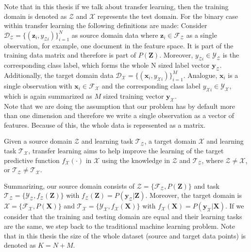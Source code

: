 Note that in this thesis if we talk about transfer learning, then the training domain is denoted as $\mathcal{Z}$ and $\mathcal{X}$ represents the test domain.
For the binary case within transfer learning the following definitions are made:
Consider $\mathcal{D_Z} = \{(\mathbf{z}_i,y_{\mathcal{Z}i})\}_{i=1}^{N}$ as source domain data where $\mathbf{z}_i \in \mathcal{F}_\mathcal{Z}$ as a single observation, for example, one document in the feature space. It is part of the training data matrix and therefore is part of $P(\mathbf{Z})$.
Moreover, $y_{\mathcal{Z}i} \in \mathcal{Y}_\mathcal{Z}$ is the corresponding class label, which forms the whole N sized label vector $\mathbf{y}_\mathcal{Z}$.
Additionally, the target domain data $\mathcal{D_X} = \{(\mathbf{x}_i,y_{\mathcal{X}i})\}_{i=1}^{M}$.
Analogue, $\mathbf{x}_i$ is a single observation with $\mathbf{x}_i \in \mathcal{F}_\mathcal{X}$ and the corresponding class label $y_{\mathcal{X}i} \in \mathcal{Y}_\mathcal{X}$, which is again summarized as $M$ sized training vector $\mathbf{y}_\mathcal{X}$.\cite[p. 2]{Aggarwal.2015}\\
Note that we are doing the assumption that our problem has by default more than one dimension and therefore we write a single observation as a vector of features.
Because of this, the whole data is represented as a matrix.
\begin{mDef}\label{DefTl}
	Given a source domain $\mathcal{Z}$ and learning task $\mathcal{T}_\mathcal{Z}$, a target domain $\mathcal{X}$ and learning task $\mathcal{T}_\mathcal{X}$, transfer learning aims to help improve the learning of the target predictive function $f_\mathcal{X}(\cdot)$ in $\mathcal{X}$ using the knowledge in $\mathcal{Z}$ and $\mathcal{T}_\mathcal{Z}$, where $\mathcal{Z} \neq \mathcal{X}$, or $\mathcal{T}_\mathcal{Z} \neq \mathcal{T}_\mathcal{X}$.\cite[p. 542]{Aggarwal.2015}
\end{mDef}
Summarizing, our source domain consists of $\mathcal{Z}=\{\mathcal{F}_\mathcal{Z},P(\mathbf{Z})\}$ and task $\mathcal{T_Z}=\{\mathcal{Y_Z},f_\mathcal{Z}(\mathbf{Z})\}$ with $f_\mathcal{Z}(\mathbf{Z}) = P(\mathbf{y}_\mathcal{Z}|\mathbf{Z})$. Moreover, the target domain is  $\mathcal{X}=\{\mathcal{F}_\mathcal{X},P(\mathbf{X})\}$ and $\mathcal{T_X}=\{\mathcal{Y_X},f_\mathcal{X}(\mathbf{X})\}$ with $f_\mathcal{X}(\mathbf{X}) = P(\mathbf{y}_\mathcal{X}|\mathbf{X})$. 
If we consider that the training and testing domain are equal and their learning tasks are the same, we step back to the traditional machine learning problem.
Note that in this thesis the size of the whole dataset (source and target data points) is denoted as $K=N+M$.
